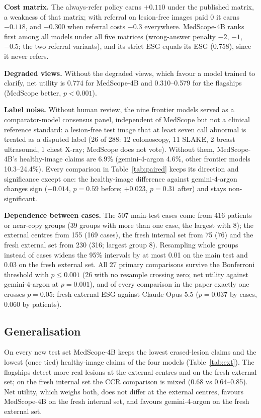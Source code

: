 \documentclass[11pt]{article}
\begin{document}
\textbf{Cost matrix.} The always-refer policy earns $+0.110$ under the published matrix, a weakness of that matrix; with referral on lesion-free images paid 0 it earns $-0.118$, and $-0.300$ when referral costs $-0.3$ everywhere. MedScope-4B ranks first among all models under all five matrices (wrong-answer penalty $-2$, $-1$, $-0.5$; the two referral variants), and its strict ESG equals its ESG (0.758), since it never refers.

\textbf{Degraded views.} Without the degraded views, which favour a model trained to clarify, net utility is 0.774 for MedScope-4B and 0.310--0.579 for the flagships (MedScope better, $p<0.001$).

\textbf{Label noise.} Without human review, the nine frontier models served as a comparator-model consensus panel, independent of MedScope but not a clinical reference standard: a lesion-free test image that at least seven call abnormal is treated as a disputed label (26 of 288: 12 colonoscopy, 11 SLAKE, 2 breast ultrasound, 1 chest X-ray; MedScope does not vote). Without them, MedScope-4B's healthy-image claims are 6.9\% (gemini-4-argon 4.6\%, other frontier models 10.3--24.4\%). Every comparison in Table~\ref{tab:paired} keeps its direction and significance except one: the healthy-image difference against gemini-4-argon changes sign ($-0.014$, $p=0.59$ before; $+0.023$, $p=0.31$ after) and stays non-significant.

\textbf{Dependence between cases.} The 507 main-test cases come from 416 patients or near-copy groups (39 groups with more than one case, the largest with 8); the external centres from 155 (169 cases), the fresh internal set from 75 (76) and the fresh external set from 230 (316; largest group 8). Resampling whole groups instead of cases widens the 95\% intervals by at most 0.01 on the main test and 0.03 on the fresh external set. All 27 primary comparisons survive the Bonferroni threshold with $p\le0.001$ (26 with no resample crossing zero; net utility against gemini-4-argon at $p=0.001$), and of every comparison in the paper exactly one crosses $p=0.05$: fresh-external ESG against Claude Opus 5.5 ($p=0.037$ by cases, $0.060$ by patients).

\subsection{Generalisation}\label{sec:gen}
On every new test set MedScope-4B keeps the lowest erased-lesion claims and the lowest (once tied) healthy-image claims of the four models (Table~\ref{tab:ext}). The flagships detect more real lesions at the external centres and on the fresh external set; on the fresh internal set the CCR comparison is mixed (0.68 vs 0.64--0.85). Net utility, which weighs both, does not differ at the external centres, favours MedScope-4B on the fresh internal set, and favours gemini-4-argon on the fresh external set.
\end{document}
